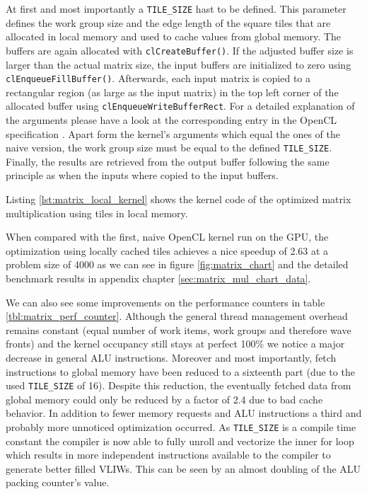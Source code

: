 At first and most importantly a \lstinline!TILE_SIZE! hast to be defined. This parameter defines the work group size and the edge length of the square tiles that are allocated in local memory and used to cache values from global memory.
The buffers are again allocated with \lstinline!clCreateBuffer()!. If the adjusted buffer size is larger than the actual matrix size, the input buffers are initialized to zero using \lstinline!clEnqueueFillBuffer()!. Afterwards, each input matrix is copied to a rectangular region (as large as the input matrix) in the top left corner of the allocated buffer using \lstinline!clEnqueueWriteBufferRect!. For a detailed explanation of the arguments please have a look at the corresponding entry in the OpenCL specification \cite[p.76]{opencl_spec}. Apart form the kernel's arguments which equal the ones of the naive version, the work group size must be equal to the defined \lstinline!TILE_SIZE!. Finally, the results are retrieved from the output buffer following the same principle as when the inputs where copied to the input buffers.

Listing \ref{lst:matrix_local_kernel} shows the kernel code of the optimized matrix multiplication using tiles in local memory.



When compared with the first, naive OpenCL kernel run on the GPU, the optimization using locally cached tiles achieves a nice speedup of 2.63 at a problem size of 4000 as we can see in figure \ref{fig:matrix_chart} and the detailed benchmark results in appendix chapter \ref{sec:matrix_mul_chart_data}.

We can also see some improvements on the performance counters in table \ref{tbl:matrix_perf_counter}. Although the general thread management overhead remains constant (equal number of work items, work groups and therefore wave fronts) and the kernel occupancy still stays at perfect 100\% we notice a major decrease in general ALU instructions. Moreover and most importantly, fetch instructions to global memory have been reduced to a sixteenth part (due to the used \lstinline!TILE_SIZE! of 16). Despite this reduction, the eventually fetched data from global memory could only be reduced by a factor of 2.4 due to bad cache behavior.
In addition to fewer memory requests and ALU instructions a third and probably more unnoticed optimization occurred. As \lstinline!TILE_SIZE! is a compile time constant the compiler is now able to fully unroll and vectorize the inner for loop which results in more independent instructions available to the compiler to generate better filled VLIWs. This can be seen by an almost doubling of the ALU packing counter's value.


